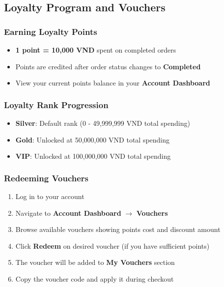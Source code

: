 \documentclass[12pt, a4paper]{report}
\begin{document}
{{\subsection{Loyalty Program and Vouchers}

\subsubsection{Earning Loyalty Points}

\begin{itemize}
    \item \textbf{1 point = 10,000 VND} spent on completed orders
    \item Points are credited after order status changes to \textbf{Completed}
    \item View your current points balance in your \textbf{Account Dashboard}
\end{itemize}

\subsubsection{Loyalty Rank Progression}

\begin{itemize}
    \item \textbf{Silver}: Default rank (0 - 49,999,999 VND total spending)
    \item \textbf{Gold}: Unlocked at 50,000,000 VND total spending
    \item \textbf{VIP}: Unlocked at 100,000,000 VND total spending
\end{itemize}

\subsubsection{Redeeming Vouchers}

\begin{enumerate}
    \item Log in to your account
    \item Navigate to \textbf{Account Dashboard} $\rightarrow$ \textbf{Vouchers}
    \item Browse available vouchers showing points cost and discount amount
    \item Click \textbf{Redeem} on desired voucher (if you have sufficient points)
    \item The voucher will be added to \textbf{My Vouchers} section
    \item Copy the voucher code and apply it during checkout
\end{enumerate}

}}
\end{document}
